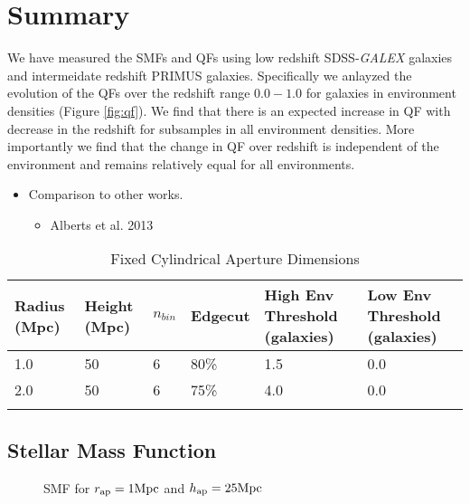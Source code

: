 \documentclass{emulateapj}
\begin{document}
\section{Summary}
We have measured the SMFs and QFs using low redshift SDSS-{\em GALEX} galaxies and intermeidate redshift PRIMUS galaxies. 
Specifically we anlayzed the evolution of the QFs over the redshift range $0.0-1.0$ for galaxies in environment densities (Figure \ref{fig:qf}). 
We find that there is an expected increase in QF with decrease in the redshift for subsamples in all environment densities.
More importantly we find that the change in QF over redshift is independent of the environment and remains relatively equal for all environments. 

\begin{itemize}
    \item Comparison to other works. 
    \begin{itemize}
        \item Alberts et al. 2013 
    \end{itemize}
\end{itemize}

%
%


\appendix
\begin{table*} %
  \caption{Fixed Cylindrical Aperture Dimensions}
  \label{tab:aperture}
  \begin{center}
    \leavevmode
    \begin{tabular}{llllll} \hline \hline              
  Radius (Mpc)          &Height (Mpc)      &$n_{bin}$   &Edgecut &High Env Threshold (galaxies) &Low Env Threshold (galaxies) \\ \hline 
  1.0 &50 &6 & 80\% & 1.5 & 0.0          \\
  2.0 &50 &6 & 75\% & 4.0 & 0.0          \\ \hline
  \multicolumn{6}{l}{}                                             \\       
    \end{tabular}
  \end{center}
\end{table*}

\subsection{Stellar Mass Function} \label{sec:smf_const}
\begin{figure*}
    \begin{center}
        \leavevmode
        \caption{SMF for $r_{\rm{ap}}=1 \rm{Mpc}$ and $h_{\rm{ap}}=25 \rm{Mpc}$}
    \end{center}
\end{figure*}
\end{document}

